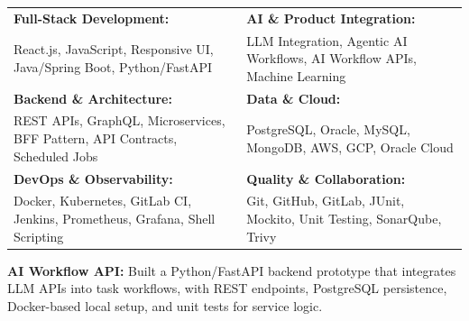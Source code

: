 \renewcommand{\arraystretch}{1.2}

\begin{tabular}{p{} p{}}
    \textbf{Full-Stack Development:} & \textbf{AI \& Product Integration:} \\
    React.js, JavaScript, Responsive UI, Java/Spring Boot, Python/FastAPI & LLM Integration, Agentic AI Workflows, AI Workflow APIs, Machine Learning \\

    \textbf{Backend \& Architecture:} & \textbf{Data \& Cloud:} \\
    REST APIs, GraphQL, Microservices, BFF Pattern, API Contracts, Scheduled Jobs & PostgreSQL, Oracle, MySQL, MongoDB, AWS, GCP, Oracle Cloud \\

    \textbf{DevOps \& Observability:} & \textbf{Quality \& Collaboration:} \\
    Docker, Kubernetes, GitLab CI, Jenkins, Prometheus, Grafana, Shell Scripting & Git, GitHub, GitLab, JUnit, Mockito, Unit Testing, SonarQube, Trivy \\
\end{tabular}


\textbf{AI Workflow API:} Built a Python/FastAPI backend prototype that integrates LLM APIs into task workflows, with REST endpoints, PostgreSQL persistence, Docker-based local setup, and unit tests for service logic.
